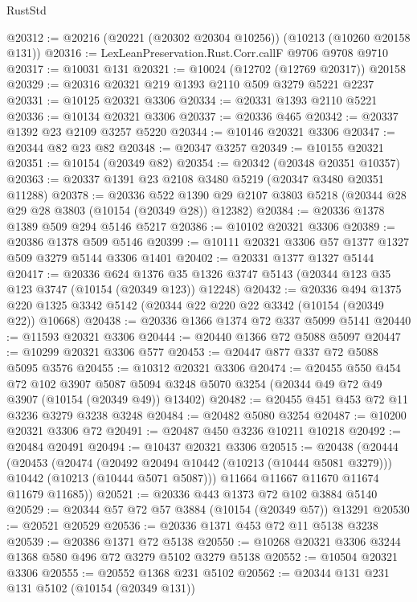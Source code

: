 \begin{lexlean}{RustStd}
\begin{coremodule}
@20312 := @20216 (@20221 (@20302 @20304 @10256)) (@10213 (@10260 @20158 @131))
@20316 := LexLeanPreservation.Rust.Corr.callF @9706 @9708 @9710
@20317 := @10031 @131
@20321 := @10024 (@12702 (@12769 @20317)) @20158
@20329 := @20316 @20321 @219 @1393 @2110 @509 @3279 @5221 @2237
@20331 := @10125 @20321 @3306
@20334 := @20331 @1393 @2110 @5221
@20336 := @10134 @20321 @3306
@20337 := @20336 @465
@20342 := @20337 @1392 @23 @2109 @3257 @5220
@20344 := @10146 @20321 @3306
@20347 := @20344 @82 @23 @82
@20348 := @20347 @3257
@20349 := @10155 @20321
@20351 := @10154 (@20349 @82)
@20354 := @20342 (@20348 @20351 @10357)
@20363 := @20337 @1391 @23 @2108 @3480 @5219 (@20347 @3480 @20351 @11288)
@20378 := @20336
    @522
    @1390
    @29
    @2107
    @3803
    @5218
    (@20344 @28 @29 @28 @3803 (@10154 (@20349 @28)) @12382)
@20384 := @20336 @1378 @1389 @509 @294 @5146 @5217
@20386 := @10102 @20321 @3306
@20389 := @20386 @1378 @509 @5146
@20399 := @10111 @20321 @3306 @57 @1377 @1327 @509 @3279 @5144 @3306 @1401
@20402 := @20331 @1377 @1327 @5144
@20417 := @20336
    @624
    @1376
    @35
    @1326
    @3747
    @5143
    (@20344 @123 @35 @123 @3747 (@10154 (@20349 @123)) @12248)
@20432 := @20336
    @494
    @1375
    @220
    @1325
    @3342
    @5142
    (@20344 @22 @220 @22 @3342 (@10154 (@20349 @22)) @10668)
@20438 := @20336 @1366 @1374 @72 @337 @5099 @5141
@20440 := @11593 @20321 @3306
@20444 := @20440 @1366 @72 @5088 @5097
@20447 := @10299 @20321 @3306 @577
@20453 := @20447 @877 @337 @72 @5088 @5095 @3576
@20455 := @10312 @20321 @3306
@20474 := @20455
    @550
    @454
    @72
    @102
    @3907
    @5087
    @5094
    @3248
    @5070
    @3254
    (@20344 @49 @72 @49 @3907 (@10154 (@20349 @49)) @13402)
@20482 := @20455 @451 @453 @72 @11 @3236 @3279 @3238 @3248
@20484 := @20482 @5080 @3254
@20487 := @10200 @20321 @3306 @72
@20491 := @20487 @450 @3236 @10211 @10218
@20492 := @20484 @20491
@20494 := @10437 @20321 @3306
@20515 := @20438
    (@20444
      (@20453
        (@20474
          (@20492 @20494 @10442 (@10213 (@10444 @5081 @3279)))
          @10442
          (@10213 (@10444 @5071 @5087)))
        @11664
        @11667
        @11670
        @11674
        @11679
        @11685))
@20521 := @20336 @443 @1373 @72 @102 @3884 @5140
@20529 := @20344 @57 @72 @57 @3884 (@10154 (@20349 @57)) @13291
@20530 := @20521 @20529
@20536 := @20336 @1371 @453 @72 @11 @5138 @3238
@20539 := @20386 @1371 @72 @5138
@20550 := @10268 @20321 @3306 @3244 @1368 @580 @496 @72 @3279 @5102 @3279 @5138
@20552 := @10504 @20321 @3306
@20555 := @20552 @1368 @231 @5102
@20562 := @20344 @131 @231 @131 @5102 (@10154 (@20349 @131))

\end{coremodule}
\end{lexlean}
